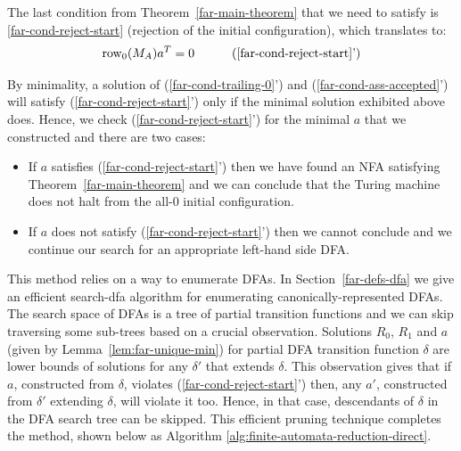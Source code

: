The last condition from Theorem~\ref{far-main-theorem} that we need to satisfy is \eqref{far-cond-reject-start} (rejection of the initial configuration), which translates to:
\begin{align}
  \row_0 (M_A) a\T & =0
                   & \tag{\ref{far-cond-reject-start}'}
\end{align}

By minimality, a solution of (\ref{far-cond-trailing-0}') and (\ref{far-cond-ass-accepted}') will satisfy (\ref{far-cond-reject-start}') only if the minimal solution exhibited above does. Hence, we check (\ref{far-cond-reject-start}') for the minimal $a$ that we constructed and there are two cases:

\begin{itemize}
  \item If $a$ satisfies (\ref{far-cond-reject-start}') then we have found an NFA satisfying Theorem~\ref{far-main-theorem} and we can conclude that the Turing machine does not halt from the all-0 initial configuration.
  \item If $a$ does not satisfy (\ref{far-cond-reject-start}') then we cannot conclude and we continue our search for an appropriate left-hand side DFA.
\end{itemize}

This method relies on a way to enumerate DFAs. In Section~\ref{far-defs-dfa} we give an efficient {\sc search-dfa} algorithm for enumerating canonically-represented DFAs. The search space of DFAs is a tree of partial transition functions and we can skip traversing some sub-trees based on a crucial observation. Solutions $R_0$, $R_1$ and $a$ (given by Lemma~\ref{lem:far-unique-min}) for partial DFA transition function $\delta$ are lower bounds of solutions for any $\delta'$ that extends $\delta$. This observation gives that if $a$, constructed from $\delta$, violates (\ref{far-cond-reject-start}') then, any $a'$, constructed from $\delta'$ extending $\delta$, will violate it too. Hence, in that case, descendants of $\delta$ in the DFA search tree can be skipped.
This efficient pruning technique completes the method, shown below as Algorithm \ref{alg:finite-automata-reduction-direct}.

